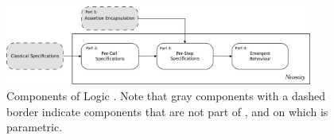 %
\begin{figure}[t]
\includegraphics[width=0.9\textwidth]{diagrams/dependency.png}
   \caption{
   Components of \Nec Logic . 
   Note that gray components with a dashed border indicate
   components that are not part of \Nec, and on which \Nec 
   is parametric.
    }
   \label{fig:dependency}
 \end{figure}
 
